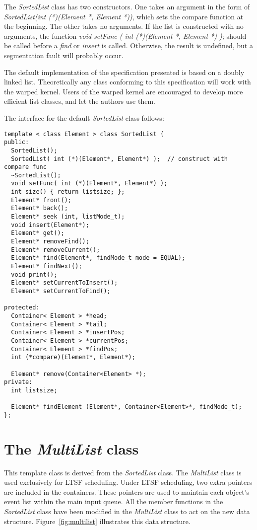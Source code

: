 \documentclass[11pt]{report}
\begin{document}
The {\it SortedList} class has two constructors.  One takes an argument
in the form of {\it SortedList(int (*)(Element *, Element *))}, which
sets the compare function at the beginning.  The other takes no
arguments.  If the list is constructed with no arguments, the function
{\it void setFunc ( int (*)(Element *, Element *) );} should be called
before a {\it find} or {\it insert} is called.  Otherwise, the result
is undefined, but a segmentation fault will probably occur.

The default implementation of the specification presented is based on a
doubly linked list.  Theoretically any class conforming to this
specification will work with the {\sc warped} kernel.  Users of the
{\sc warped} kernel are encouraged to develop more efficient list
classes, and let the authors use them.

The interface for the default {\it SortedList} class follows:

\begin{verbatim}
template < class Element > class SortedList {
public:
  SortedList();
  SortedList( int (*)(Element*, Element*) );  // construct with compare func
  ~SortedList();
  void setFunc( int (*)(Element*, Element*) );
  int size() { return listsize; };
  Element* front();
  Element* back();
  Element* seek (int, listMode_t);
  void insert(Element*);
  Element* get();
  Element* removeFind();
  Element* removeCurrent();
  Element* find(Element*, findMode_t mode = EQUAL);
  Element* findNext();
  void print();
  Element* setCurrentToInsert();
  Element* setCurrentToFind();

protected:
  Container< Element > *head;
  Container< Element > *tail;
  Container< Element > *insertPos;
  Container< Element > *currentPos;
  Container< Element > *findPos;
  int (*compare)(Element*, Element*);
  
  Element* remove(Container<Element> *);
private:
  int listsize;

  Element* findElement (Element*, Container<Element>*, findMode_t);
};

\end{verbatim}

\section{The {\it MultiList} class}

This template class is derived from the {\it SortedList} class. The
{\it MultiList} class is used exclusively for LTSF scheduling. Under
LTSF scheduling, two extra pointers are included in the
containers. These pointers are used to maintain each object's event list
within the main input queue. All the member functions in the
{\it SortedList} class have been modified in the {\it MultiList}
class to act on the new data structure. Figure~\ref{fig:multilist}
illustrates this data structure.
\end{document}
